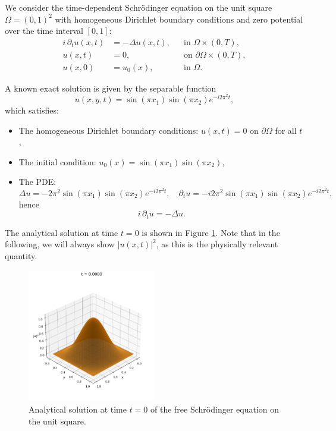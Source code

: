 \documentclass{article}
\theoremstyle{definition}
\theoremstyle{plain}
\theoremstyle{remark}
\begin{document}
We consider the time-dependent Schrödinger equation on the unit square $\Omega = (0,1)^2$ with homogeneous Dirichlet boundary conditions and zero potential over the time interval $[0,1]$:
\begin{align*}
i \, \partial_t u(x,t) &= -\Delta u(x,t), &&\text{in } \Omega \times (0,T), \\
u(x,t) &= 0, &&\text{on } \partial \Omega \times (0,T), \\
u(x,0) &= u_0(x), &&\text{in } \Omega.
\end{align*}

A known exact solution is given by the separable function
\[
u(x,y,t) = \sin(\pi x_1)\sin(\pi x_2) e^{-i 2\pi^2 t},
\]
which satisfies:
\begin{itemize}
  \item The homogeneous Dirichlet boundary conditions: $u(x,t) = 0$ on $\partial \Omega$ for all $t$,
  \item The initial condition: $u_0(x) = \sin(\pi x_1)\sin(\pi x_2)$,
  \item The PDE:
  \[
  \Delta u = -2\pi^2 \sin(\pi x_1)\sin(\pi x_2) e^{-i 2\pi^2 t}, \quad
  \partial_t u = -i 2\pi^2 \sin(\pi x_1)\sin(\pi x_2) e^{-i 2\pi^2 t},
  \]
  hence
  \[
  i \, \partial_t u = -\Delta u.
  \]
\end{itemize}

The analytical solution at time $t = 0$ is shown in Figure \ref{fig:initial_state}. Note that in the following, we will always show $|u(x,t)|^2$, as this is the physically relevant quantity.

\begin{figure}[h!]
  \centering
  \includegraphics[width=0.5\textwidth, trim=0cm 0cm 0cm 1cm, clip]{figures/initial_state_3d.png}
  \caption{Analytical solution at time $t = 0$ of the free Schrödinger equation on the unit square.}
  \label{fig:initial_state}
\end{figure}
\end{document}
